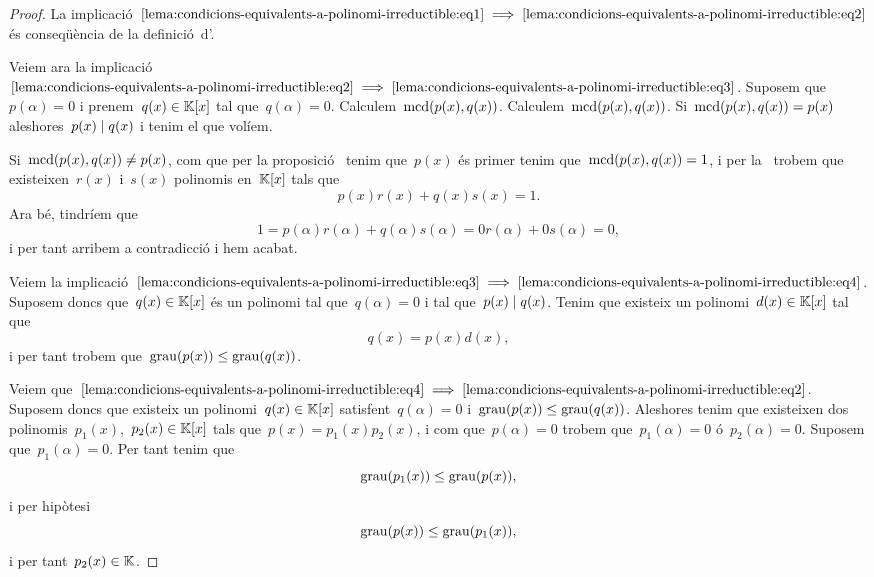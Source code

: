 \documentclass[../teoria-de-Galois.tex]{subfiles}
\begin{document}
    \begin{proof}
        La implicació~\(\eqref{lema:condicions-equivalents-a-polinomi-irreductible:eq1}\implies\eqref{lema:condicions-equivalents-a-polinomi-irreductible:eq2}\) és conseqüència de la definició~d'.

        Veiem ara la implicació~\(\eqref{lema:condicions-equivalents-a-polinomi-irreductible:eq2}\implies\eqref{lema:condicions-equivalents-a-polinomi-irreductible:eq3}\).
        Suposem que~\(p(\alpha)=0\) i prenem~\(q(x)\in\mathbb{K}[x]\) tal que~\(q(\alpha)=0\).
        Calculem~\(\operatorname{mcd}(p(x),q(x))\).
        Calculem~\(\operatorname{mcd}(p(x),q(x))\).
        Si~\(\operatorname{mcd}(p(x),q(x))=p(x)\) aleshores~\(p(x)\mathrel{|} q(x)\) i tenim el que volíem.

        Si~\(\operatorname{mcd}(p(x),q(x))\neq p(x)\), com que per la proposició~ tenim que~\(p(x)\) és primer tenim que~\(\operatorname{mcd}(p(x),q(x))=1\), i per la~ trobem que existeixen~\(r(x)\) i~\(s(x)\) polinomis en~\(\mathbb{K}[x]\) tals que
        \[
            p(x)r(x)+q(x)s(x)=1.
        \]
        Ara bé, tindríem que
        \[
            1=p(\alpha)r(\alpha)+q(\alpha)s(\alpha)=0r(\alpha)+0s(\alpha)=0,
        \]
        i per tant arribem a contradicció i hem acabat.

        Veiem la implicació~\(\eqref{lema:condicions-equivalents-a-polinomi-irreductible:eq3}\implies\eqref{lema:condicions-equivalents-a-polinomi-irreductible:eq4}\).
        Suposem doncs que~\(q(x)\in\mathbb{K}[x]\) és un polinomi tal que~\(q(\alpha)=0\) i tal que~\(p(x)\mathrel{|} q(x)\).
        Tenim que existeix un polinomi~\(d(x)\in\mathbb{K}[x]\) tal que
        \[
            q(x)=p(x)d(x),
        \]
        i per tant trobem que~\(\operatorname{grau}(p(x))\leq\operatorname{grau}(q(x))\).

        Veiem que~\(\eqref{lema:condicions-equivalents-a-polinomi-irreductible:eq4}\implies\eqref{lema:condicions-equivalents-a-polinomi-irreductible:eq2}\).
        Suposem doncs que existeix un polinomi~\(q(x)\in\mathbb{K}[x]\) satisfent~\(q(\alpha)=0\) i~\(\operatorname{grau}(p(x))\leq\operatorname{grau}(q(x))\).
        Aleshores tenim que existeixen dos polinomis~\(p_{1}(x)\),~\(p_{2}(x)\in\mathbb{K}[x]\) tals que~\(p(x)=p_{1}(x)p_{2}(x)\), i com que~\(p(\alpha)=0\) trobem que~\(p_{1}(\alpha)=0\) ó~\(p_{2}(\alpha)=0\).
        Suposem que~\(p_{1}(\alpha)=0\).
        Per tant tenim que
        \[
            \operatorname{grau}(p_{1}(x))\leq\operatorname{grau}(p(x)),
        \]
        i per hipòtesi
        \[
            \operatorname{grau}(p(x))\leq\operatorname{grau}(p_{1}(x)),
        \]
        i per tant~\(p_{2}(x)\in\mathbb{K}\).


\end{proof}
\end{document}
